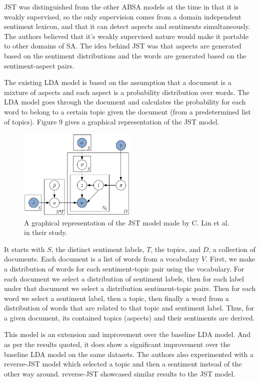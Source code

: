 \documentclass[conference]{IEEEtran}
\begin{document}
JST was distinguished from the other ABSA models at the time in that it is weakly supervised, so the only supervision comes from a domain independent sentiment lexicon, and that it can detect aspects and sentiments simultaneously. The authors believed that it's weakly supervised nature would make it portable to other domains of SA. The idea behind JST was that aspects are generated based on the sentiment distributions and the words are generated based on the sentiment-aspect pairs.

The existing LDA model is based on the assumption that a document is a mixture of aspects and each aspect is a probability distribution over words. The LDA model goes through the document and calculates the probability for each word to belong to a certain topic given the document (from a predetermined list of topics). Figure 9 gives a graphical representation of the JST model.

\begin{figure}[htbp]
\centerline{\includegraphics[keepaspectratio, width=0.5\textwidth]{pics/9.png}}
\caption{A graphical representation of the JST model made by C. Lin et al. in their study.}
\label{fig}
\end{figure}

It starts with $S$, the distinct sentiment labels, $T$, the topics, and $D$, a collection of documents. Each document is a list of words from a vocabulary $V$. First, we make a distribution of words for each sentiment-topic pair using the vocabulary. For each document we select a distribution of sentiment labels, then for each label under that document we select a distribution sentiment-topic pairs. Then for each word we select a sentiment label, then a topic, then finally a word from a distribution of words that are related to that topic and sentiment label. Thus, for a given document, its contained topics (aspects) and their sentiments are derived.

This model is an extension and improvement over the baseline LDA model. And as per the results quoted, it does show a significant improvement over the baseline LDA model on the same datasets. The authors also experimented with a reverse-JST model which selected a topic and then a sentiment instead of the other way around. reverse-JST showcased similar results to the JST model.\\
\end{document}
